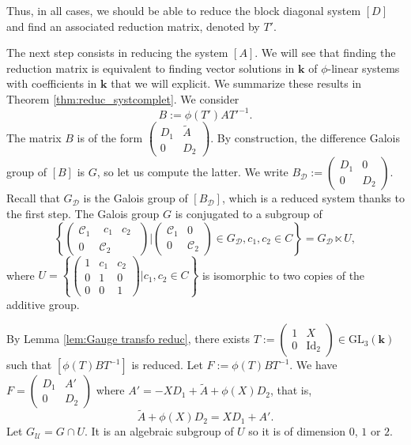 \documentclass[a4paper,11pt]{amsart}
\newcommand{\GL}{\operatorname{GL}}
\newcommand{\Gdiag}{G_{\mathcal{D}}}
\newcommand{\Gunip}{G_{\mathcal{U}}}
\def\k{\mathbf{k}}
\def\GL{\mathrm{GL}}
\begin{document}
  Thus, in all cases, we should be able to reduce the block diagonal system $[D]$ and find an associated reduction matrix, denoted by $T'$.  


\bigskip


The next step consists in reducing the system $[A]$.  We will see that finding the reduction matrix is equivalent to finding vector solutions in $\k$ of $\phi$-linear systems with coefficients in $\k$ that we will explicit. We summarize these results in Theorem \ref{thm:reduc_systcomplet}. We consider
$$B:=\phi(T')A T'^{-1}.
$$
The matrix $B$ is of the form $ \begin{pmatrix}
D_1& \widetilde{A} \\ 
0 &D_2
\end{pmatrix}$. By construction, the difference Galois group of $[B]$ is $G$, so let us compute the latter.  We write $B_{\mathcal{D}}:=\begin{pmatrix}
D_1&0 \\ 
0 & D_2
\end{pmatrix}$.  
Recall that  $\Gdiag$ is the Galois group of $[B_{\mathcal{D}}]$,  which is a reduced system thanks to the first step.
The Galois group $G$ is conjugated to a subgroup of 
$$\left\{ \begin{pmatrix}
\mathscr{C}_1& \begin{matrix} c_1& c_2 \end{matrix} \\ 
0 & \mathscr{C}_2
\end{pmatrix}\Bigg|   \begin{pmatrix}
\mathscr{C}_1& 0 \\ 
0 & \mathscr{C}_2
\end{pmatrix} \in \Gdiag,   c_1,c_2\in C \right\} =\Gdiag \ltimes U,
$$
where $U=\left\{ \begin{pmatrix}
1& c_1& c_2 \\ 
0 & 1 &0 \\
0&0&1
\end{pmatrix}\Bigg|   c_1,c_2\in C \right\}$  is isomorphic to two copies of the additive group.  

By Lemma \ref{lem:Gauge transfo reduc}, there exists $T:=\begin{pmatrix}
1& X \\ 
0 & \mathrm{Id}_2
\end{pmatrix}\in \GL_3 (\k)$
such that $[\phi(T)BT^{-1}]$ is reduced. 
 Let  $F:=\phi(T)BT^{-1}$.
 We have $F=  \begin{pmatrix}
D_1& A' \\ 
0 & D_2
\end{pmatrix}$ where $A' = - XD_1 +\widetilde{A}+\phi(X)D_2 $, that is, 
$$\widetilde{A}+\phi(X)D_2=XD_1 +A'.$$
Let $\Gunip=G \cap U$.  It is an algebraic subgroup of $U$ so it is of dimension $0$,  $1$ or $2$.
\end{document}
